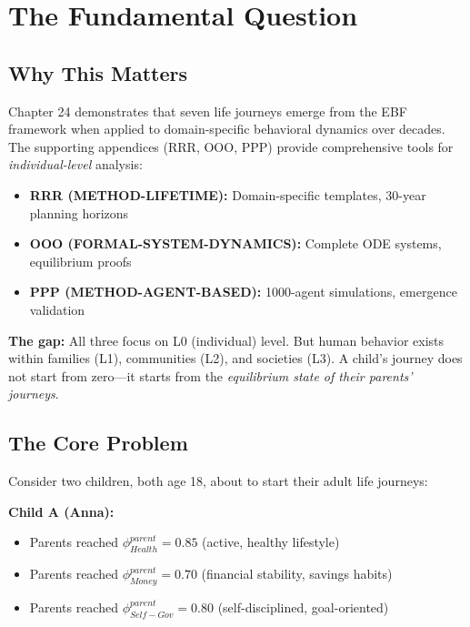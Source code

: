 
\section{The Fundamental Question}
\label{sec:BI-fundamental}

\subsection{Why This Matters}

Chapter 24 demonstrates that seven life journeys emerge from the EBF framework when
applied to domain-specific behavioral dynamics over decades. The supporting appendices
(RRR, OOO, PPP) provide comprehensive tools for \textit{individual-level} analysis:

\begin{itemize}[nosep]
\item \textbf{RRR (METHOD-LIFETIME):} Domain-specific templates, 30-year planning horizons
\item \textbf{OOO (FORMAL-SYSTEM-DYNAMICS):} Complete ODE systems, equilibrium proofs
\item \textbf{PPP (METHOD-AGENT-BASED):} 1000-agent simulations, emergence validation
\end{itemize}

\textbf{The gap:} All three focus on L0 (individual) level. But human behavior exists
within families (L1), communities (L2), and societies (L3). A child's journey does not
start from zero---it starts from the \textit{equilibrium state of their parents' journeys}.

\subsection{The Core Problem}

Consider two children, both age 18, about to start their adult life journeys:

\textbf{Child A (Anna):}
\begin{itemize}[nosep]
\item Parents reached $\phi_{Health}^{parent} = 0.85$ (active, healthy lifestyle)
\item Parents reached $\phi_{Money}^{parent} = 0.70$ (financial stability, savings habits)
\item Parents reached $\phi_{Self-Gov}^{parent} = 0.80$ (self-disciplined, goal-oriented)
\end{itemize}

